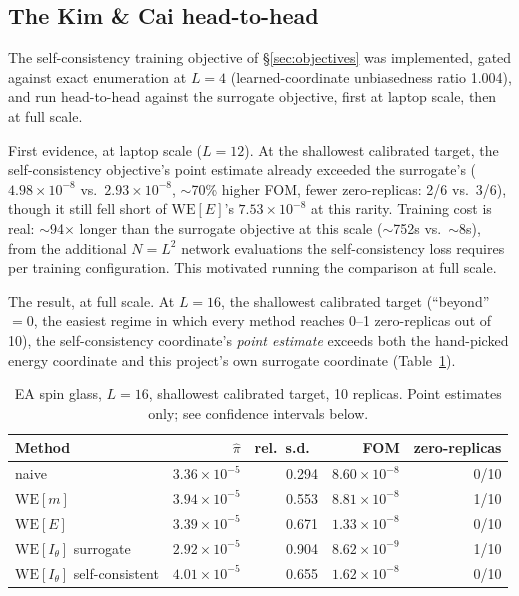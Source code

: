\documentclass[11pt]{article}
\begin{document}
	\subsection{The Kim \& Cai head-to-head}
	\label{sec:kimcai}
	The self-consistency training objective of \S\ref{sec:objectives} was implemented, gated
	against exact enumeration at $L=4$ (learned-coordinate unbiasedness ratio 1.004), and run
	head-to-head against the surrogate objective, first at laptop scale, then at full scale.
	
	First evidence, at laptop scale ($L=12$). At the shallowest calibrated target, the
	self-consistency objective's point estimate already exceeded the surrogate's
	($4.98\times10^{-8}$ vs.\ $2.93\times10^{-8}$, $\sim$70\% higher FOM, fewer zero-replicas:
	2/6 vs.\ 3/6), though it still fell short of $\mathrm{WE}[E]$'s $7.53\times10^{-8}$ at this
	rarity. Training cost is real: $\sim$94$\times$ longer than the surrogate objective at this
	scale ($\sim$752s vs.\ $\sim$8s), from the additional $N=L^2$ network evaluations the
	self-consistency loss requires per training configuration. This motivated running the
	comparison at full scale.
	
	The result, at full scale. At $L=16$, the shallowest calibrated target (``beyond''\,$=0$,
	the easiest regime in which every method reaches 0--1 zero-replicas out of 10), the
	self-consistency coordinate's \emph{point estimate} exceeds both the hand-picked energy
	coordinate and this project's own surrogate coordinate (Table~\ref{tab:kimcai}).
	
	\begin{table}[h]
		\centering\small
		\caption{EA spin glass, $L=16$, shallowest calibrated target, 10 replicas. Point estimates
			only; see confidence intervals below.}
		\label{tab:kimcai}
		\begin{tabular}{lrrrr}
			\toprule
			Method & $\hat\pi$ & rel.\ s.d.\ & FOM & zero-replicas \\
			\midrule
			naive & $3.36\times10^{-5}$ & 0.294 & $8.60\times10^{-8}$ & 0/10 \\
			$\mathrm{WE}[m]$ & $3.94\times10^{-5}$ & 0.553 & $8.81\times10^{-8}$ & 1/10 \\
			$\mathrm{WE}[E]$ & $3.39\times10^{-5}$ & 0.671 & $1.33\times10^{-8}$ & 0/10 \\
			$\mathrm{WE}[I_\theta]$ surrogate & $2.92\times10^{-5}$ & 0.904 & $8.62\times10^{-9}$ & 1/10 \\
			$\mathrm{WE}[I_\theta]$ self-consistent & $4.01\times10^{-5}$ & 0.655 &
			$1.62\times10^{-8}$ & 0/10 \\
			\bottomrule
		\end{tabular}
	\end{table}
	
\end{document}
